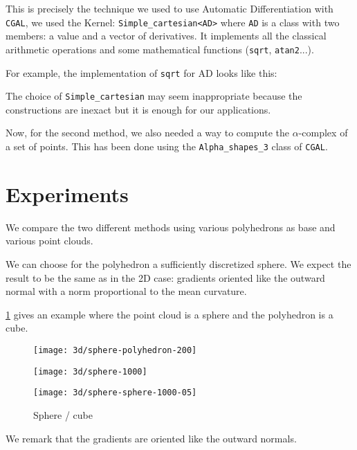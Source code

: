 This is precisely the technique we used to use Automatic Differentiation with
\texttt{CGAL}, we used the Kernel: \texttt{Simple\_cartesian<AD>} where
\texttt{AD} is a class with two members: a value and a vector of derivatives.
It implements all the classical arithmetic operations and some mathematical
functions (\texttt{sqrt}, \texttt{atan2}...).

For example, the implementation of \texttt{sqrt} for AD looks like this:


The choice of \texttt{Simple\_cartesian} may seem inappropriate because the
constructions are inexact but it is enough for our applications.

Now, for the second method, we also needed a way to compute the $\alpha$-complex
of a set of points. This has been done using the \texttt{Alpha\_shapes\_3} class
of \texttt{CGAL}.


\section{Experiments}


We compare the two different methods using various polyhedrons as base and
various point clouds.

We can choose for the polyhedron a sufficiently discretized sphere. We expect
the result to be the same as in the 2D case: gradients oriented like the outward
normal with a norm proportional to the mean curvature.

\ref{fig:3d-mean-curvature-sphere-cube} gives an example where the point cloud
is a sphere and the polyhedron is a cube.

\begin{figure}[h]
    \centering
    \begin{minipage}{0.32\linewidth}
        \centering
        \texttt{[image: 3d/sphere-polyhedron-200]}
    \end{minipage}
    \begin{minipage}{0.32\linewidth}
        \centering
        \texttt{[image: 3d/sphere-1000]}
    \end{minipage}
    \begin{minipage}{0.32\linewidth}
        \centering
        \texttt{[image: 3d/sphere-sphere-1000-05]}
    \end{minipage}
    \caption{Sphere / cube}
    \label{fig:3d-mean-curvature-sphere-cube}
\end{figure}
We remark that the gradients are oriented like the outward normals.


